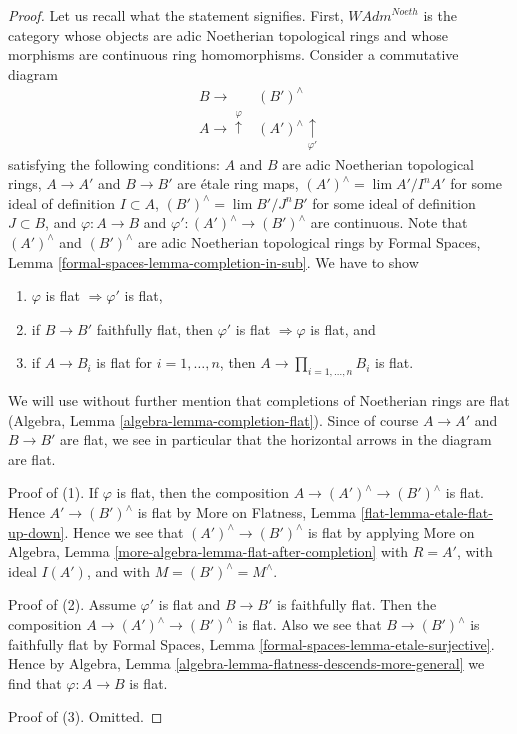 \begin{proof}
Let us recall what the statement signifies. First,
$\textit{WAdm}^{Noeth}$ is the category whose objects are
adic Noetherian topological rings and whose morphisms are
continuous ring homomorphisms. Consider a commutative diagram
$$
\begin{array}{cc}B \longrightarrow & (B')^\wedge \\ A \longrightarrow\overset{\varphi}{\uparrow} & (A')^\wedge \underset{\varphi'}{\uparrow}\end{array}
$$
satisfying the following conditions:
$A$ and $B$ are adic Noetherian topological rings,
$A \to A'$ and $B \to B'$ are \'etale ring maps,
$(A')^\wedge = \lim A'/I^nA'$ for some ideal of definition $I \subset A$,
$(B')^\wedge = \lim B'/J^nB'$ for some ideal of definition $J \subset B$, and
$\varphi : A \to B$ and $\varphi' : (A')^\wedge \to (B')^\wedge$
are continuous. Note that $(A')^\wedge$ and $(B')^\wedge$ are
adic Noetherian topological rings by
Formal Spaces, Lemma \ref{formal-spaces-lemma-completion-in-sub}.
We have to show
\begin{enumerate}
\item $\varphi$ is flat $\Rightarrow \varphi'$ is flat,
\item if $B \to B'$ faithfully flat, then $\varphi'$ is flat
$\Rightarrow \varphi$ is flat, and
\item if $A \to B_i$ is flat for $i = 1, \ldots, n$, then
$A \to \prod_{i = 1, \ldots, n} B_i$ is flat.
\end{enumerate}
We will use without further mention that completions of Noetherian rings
are flat (Algebra, Lemma \ref{algebra-lemma-completion-flat}). Since
of course $A \to A'$ and $B \to B'$ are flat, we see in
particular that the horizontal arrows in the diagram are flat.

\medskip\noindent
Proof of (1). If $\varphi$ is flat, then the composition
$A \to (A')^\wedge \to (B')^\wedge$ is flat. Hence $A' \to (B')^\wedge$
is flat by More on Flatness, Lemma \ref{flat-lemma-etale-flat-up-down}.
Hence we see that $(A')^\wedge \to (B')^\wedge$ is flat by applying
More on Algebra, Lemma \ref{more-algebra-lemma-flat-after-completion}
with $R = A'$, with ideal $I(A')$, and with $M = (B')^\wedge = M^\wedge$.

\medskip\noindent
Proof of (2). Assume $\varphi'$ is flat and $B \to B'$ is faithfully flat.
Then the composition $A \to (A')^\wedge \to (B')^\wedge$ is flat.
Also we see that $B \to (B')^\wedge$ is faithfully flat by
Formal Spaces, Lemma
\ref{formal-spaces-lemma-etale-surjective}.
Hence by Algebra, Lemma \ref{algebra-lemma-flatness-descends-more-general}
we find that $\varphi : A \to B$ is flat.

\medskip\noindent
Proof of (3). Omitted.
\end{proof}

